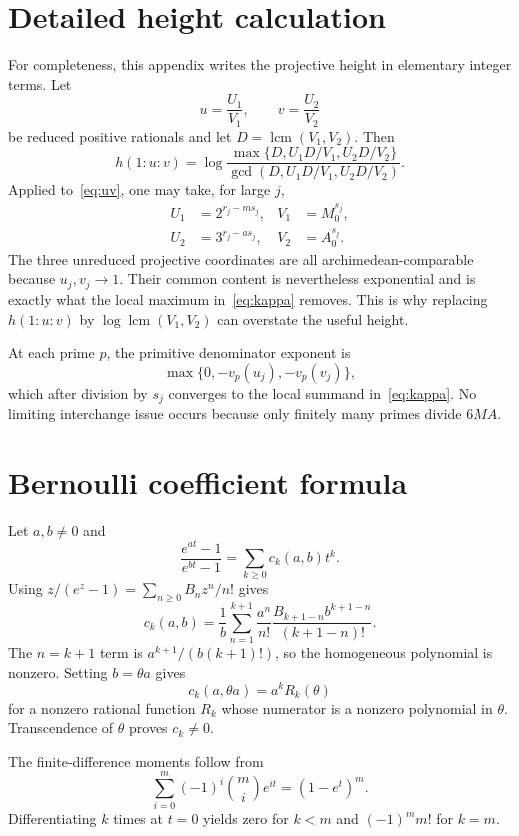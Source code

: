 \documentclass[11pt,oneside]{article}
\theoremstyle{definition}
\theoremstyle{remark}
\newcommand{\lcm}{\operatorname{lcm}}
\begin{document}
\appendix

\section{Detailed height calculation}
\label{app:height}

For completeness, this appendix writes the projective height in elementary integer terms.
Let
\[
 u=\frac{U_1}{V_1},\qquad v=\frac{U_2}{V_2}
\]
be reduced positive rationals and let $D=\lcm(V_1,V_2)$.  Then
\[
 h(1:u:v)=
 \log\frac{\max\{D,U_1D/V_1,U_2D/V_2\}}
 {\gcd(D,U_1D/V_1,U_2D/V_2)}.
\]
Applied to~\eqref{eq:uv}, one may take, for large $j$,
\begin{align*}
 U_1&=2^{r_j-ms_j},&V_1&=M_0^{s_j},\\
 U_2&=3^{r_j-as_j},&V_2&=A_0^{s_j}.
\end{align*}
The three unreduced projective coordinates are all archimedean-comparable because
$u_j,v_j\to1$.  Their common content is nevertheless exponential and is exactly what the
local maximum in~\eqref{eq:kappa} removes.  This is why replacing $h(1:u:v)$ by
$\log\lcm(V_1,V_2)$ can overstate the useful height.

At each prime $p$, the primitive denominator exponent is
\[
 \max\{0,-v_p(u_j),-v_p(v_j)\},
\]
which after division by $s_j$ converges to the local summand in~\eqref{eq:kappa}.  No limiting
interchange issue occurs because only finitely many primes divide $6MA$.

\section{Bernoulli coefficient formula}
\label{app:bernoulli}

Let $a,b\ne0$ and
\[
 \frac{e^{at}-1}{e^{bt}-1}=\sum_{k\ge0}c_k(a,b)t^k.
\]
Using $z/(e^z-1)=\sum_{n\ge0}B_nz^n/n!$ gives
\begin{equation}
 c_k(a,b)=
 \frac1b
 \sum_{n=1}^{k+1}
 \frac{a^n}{n!}
 \frac{B_{k+1-n}b^{k+1-n}}{(k+1-n)!}.
 \label{eq:ck-bernoulli}
\end{equation}
The $n=k+1$ term is $a^{k+1}/(b(k+1)!)$, so the homogeneous polynomial is nonzero.  Setting
$b=\theta a$ gives
\[
 c_k(a,\theta a)=a^kR_k(\theta)
\]
for a nonzero rational function $R_k$ whose numerator is a nonzero polynomial in $\theta$.
Transcendence of $\theta$ proves $c_k\ne0$.

The finite-difference moments follow from
\[
 \sum_{i=0}^m(-1)^i\binom mi e^{it}=(1-e^t)^m.
\]
Differentiating $k$ times at $t=0$ yields zero for $k<m$ and $(-1)^mm!$ for $k=m$.
\end{document}
